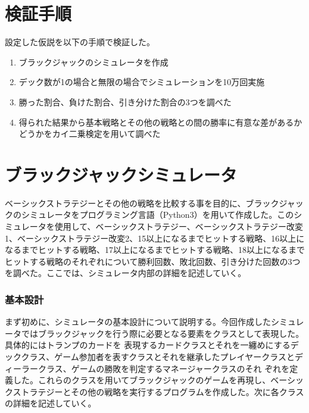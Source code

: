 \section{検証手順}
設定した仮説を以下の手順で検証した。
\begin{enumerate}
\item ブラックジャックのシミュレータを作成
\item デック数が1の場合と無限の場合でシミュレーションを10万回実施
\item 勝った割合、負けた割合、引き分けた割合の3つを調べた
\item 得られた結果から基本戦略とその他の戦略との間の勝率に有意な差があるかどうかをカイ二乗検定を用いて調べた
\end{enumerate}

\section{ブラックジャックシミュレータ}
ベーシックストラテジーとその他の戦略を比較する事を目的に、ブラックジャックのシミュレータをプログラミング言語（Python3）を用いて作成した。このシミュレータを使用して、ベーシックストラテジー、ベーシックストラテジー改変1、ベーシックストラテジー改変2、15以上になるまでヒットする戦略、16以上になるまでヒットする戦略、17以上になるまでヒットする戦略、18以上になるまでヒットする戦略のそれぞれについて勝利回数、敗北回数、引き分けた回数の3つを調べた。ここでは、シミュレータ内部の詳細を記述していく。



\subsubsection{基本設計}
まず初めに、シミュレータの基本設計について説明する。今回作成したシミュレータではブラックジャックを行う際に必要となる要素をクラスとして表現した。具体的にはトランプのカードを
表現するカードクラスとそれを一纏めにするデッククラス、ゲーム参加者を表すクラスとそれを継承したプレイヤークラスとディーラークラス、ゲームの勝敗を判定するマネージャークラスのそれ
ぞれを定義した。これらのクラスを用いてブラックジャックのゲームを再現し、ベーシックストラテジーとその他の戦略を実行するプログラムを作成した。次に各クラスの詳細を記述していく。

